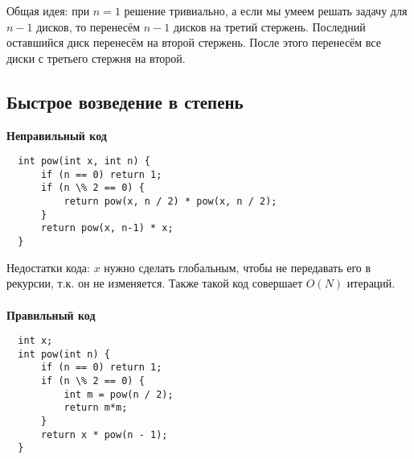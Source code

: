 \documentclass{article}
\begin{document}
Общая идея: при $n = 1$ решение тривиально, а если мы умеем решать задачу для $n-1$ дисков, то перенесём $n-1$
дисков на третий стержень. Последний оставшийся диск перенесём на второй стержень. После этого перенесём все диски
с третьего стержня на второй.

\subsection{Быстрое возведение в степень}

\textbf{Неправильный код}

\noindent
\begin{lstlisting}
  int pow(int x, int n) {
      if (n == 0) return 1;
      if (n \% 2 == 0) {
          return pow(x, n / 2) * pow(x, n / 2);
      }
      return pow(x, n-1) * x;
  }
\end{lstlisting}

Недостатки кода: $x$ нужно сделать глобальным, чтобы не передавать его в рекурсии, т.к. он не изменяется.
Также такой код совершает $O(N)$ итераций.

\newpage
\paragraph{}
\textbf{Правильный код}

\noindent
\begin{lstlisting}
  int x;
  int pow(int n) {
      if (n == 0) return 1;
      if (n \% 2 == 0) {
          int m = pow(n / 2);
          return m*m;
      }
      return x * pow(n - 1);
  }
\end{lstlisting}
\end{document}
